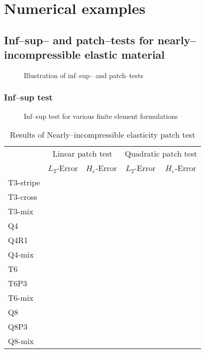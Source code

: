 \section{Numerical examples}

\subsection{Inf--sup-- and patch--tests for nearly--incompressible elastic material}

\begin{figure}[!ht]
\centering
\caption{Illustration of inf--sup-- and patch--tests}\label{infsup_illsutration}
\end{figure}

\subsubsection{Inf--sup test}

\begin{figure}[!ht]
\centering
\caption{Inf--sup test for various finite element formulations}\label{infsup_convergence}
\end{figure}

\begin{table}[!ht]
\centering
\caption{Results of Nearly--incompressible elasticity patch test}\label{patchtest_result}
\begin{tabular}{lcccc}
\toprule
 & \multicolumn{2}{c}{Linear patch test} & \multicolumn{2}{c}{Quadratic patch test} \\ \cline{2-5}
 & $L_2$-Error & $H_e$-Error & $L_2$-Error & $H_e$-Error \\
\midrule
    T3-stripe & & & & \\
    T3-cross & & & & \\
    T3-mix & & & & \\
    Q4 & & & & \\
    Q4R1 & & & & \\
    Q4-mix & & & \\
    T6 & & & & \\
    T6P3 & & & & \\
    T6-mix & & & & \\
    Q8 & & & & \\
    Q8P3 & & & & \\
    Q8-mix & & & & \\
\bottomrule
\end{tabular}
\end{table}

